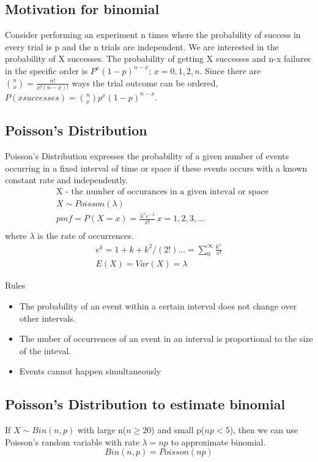 \documentclass{article}
\begin{document}
    \subsection*{Motivation for binomial}
    Consider performing an experiment n times where the probability of success in every trial is p 
    and the n trials are independent. We are interested in the probability of X successes. The probability 
    of getting X successes and n-x failures in the specific order is $P^{x}(1-p)^{n-x};\, x = 0, 1, 2, n$. 
    Since there are ${n \choose x} = \frac{n!}{x!(n-x)!}$ ways the trial outcome can be ordered, $P(x successes) = {n\choose x}p^{x}(1-p)^{n-x}$.

    \subsection*{Poisson's Distribution}
    Poisson's Distribution expresses the probability of a given number of events occurring in a 
    fixed interval of time or space if these events occurs with a known constant rate and independently.
    \begin{align*}
        &\text{X - the number of occurances in a given inteval or space}\\
        &X\sim Poisson(\lambda)\\
        &pmf = P(X=x) = \frac{\lambda^{x}e^{-\lambda}}{x!}\, x = 1, 2, 3, \dots\\
    \end{align*}
    where $\lambda$ is the rate of occurrences.
    \begin{align*}
       e^{k} = 1 + k + k^{2} / (2!) ... = \sum_{0}^{\infty} \frac{k^{x}}{x!}\\
       E(X) = Var(X)= \lambda
    \end{align*}

    Rules
    \begin{itemize}
        \item  The probability of an event within a certain interval does not change over other intervals.
        \item The umber of occurrences of an event in an interval is proportional to the size of the inteval.
        \item Events cannot happen simultaneously
    \end{itemize}
    \subsection*{Poisson's Distribution to estimate binomial}
    If $X\sim Bin(n, p)$ with large n($n \geq 20$) and small p($np < 5$), then we can use Poisson's random variable with rate 
    $\lambda = np$ to approximate binomial.
    \begin{equation*}
        Bin(n, p) = Poisson(np)
    \end{equation*}
   
\end{document}
